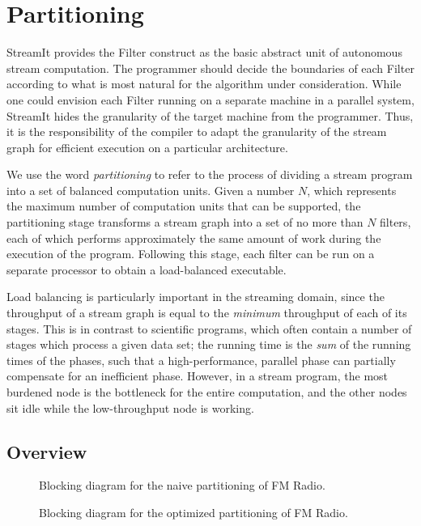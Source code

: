 \section{Partitioning}

StreamIt provides the Filter construct as the basic abstract unit of
autonomous stream computation.  The programmer should decide the
boundaries of each Filter according to what is most natural for the
algorithm under consideration.  While one could envision each Filter
running on a separate machine in a parallel system, StreamIt hides the
granularity of the target machine from the programmer.  Thus, it is
the responsibility of the compiler to adapt the granularity of the
stream graph for efficient execution on a particular architecture.

We use the word {\it partitioning} to refer to the process of dividing
a stream program into a set of balanced computation units.  Given a
number $N$, which represents the maximum number of computation units
that can be supported, the partitioning stage transforms a stream
graph into a set of no more than $N$ filters, each of which performs
approximately the same amount of work during the execution of the
program.  Following this stage, each filter can be run on a separate
processor to obtain a load-balanced executable.

Load balancing is particularly important in the streaming domain,
since the throughput of a stream graph is equal to the {\it minimum}
throughput of each of its stages.  This is in contrast to scientific
programs, which often contain a number of stages which process a given
data set; the running time is the {\it sum} of the running times of
the phases, such that a high-performance, parallel phase can partially
compensate for an inefficient phase.  However, in a stream program,
the most burdened node is the bottleneck for the entire computation,
and the other nodes sit idle while the low-throughput node is working.

\subsection{Overview}

\begin{figure}[t]
\vspace{-6pt}
\begin{minipage}{3.1in}
\vspace{-12pt}
\caption{\protect\small Blocking diagram for the naive partitioning of
 FM Radio.
\protect\label{fig:fmblood1}}
\end{minipage}
\hspace{0.3in}
\vspace{-12pt}
\begin{minipage}{3.1in}
\caption{\protect\small Blocking diagram for the optimized
partitioning of FM Radio.
\protect\label{fig:fmblood2}}
\end{minipage}
\vspace{-6pt}
\end{figure}

